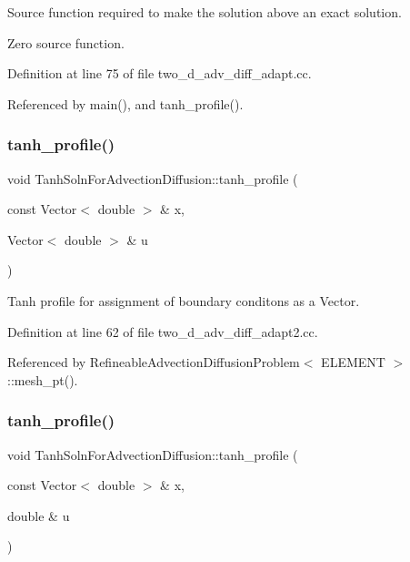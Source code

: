 Source function required to make the solution above an exact solution. 

Zero source function. 

Definition at line 75 of file two\+\_\+d\+\_\+adv\+\_\+diff\+\_\+adapt.\+cc.



Referenced by main(), and tanh\+\_\+profile().

\mbox{\label{namespaceTanhSolnForAdvectionDiffusion_a4016f2f5bd0c82061bee09043dc8e8e6}} 
\subsubsection{\texorpdfstring{tanh\+\_\+profile()}{tanh\_profile()}\hspace{0.1cm}{\footnotesize\ttfamily [1/2]}}
{\footnotesize\ttfamily void Tanh\+Soln\+For\+Advection\+Diffusion\+::tanh\+\_\+profile (\begin{DoxyParamCaption}\item[{const Vector$<$ double $>$ \&}]{x,  }\item[{Vector$<$ double $>$ \&}]{u }\end{DoxyParamCaption})}



Tanh profile for assignment of boundary conditons as a Vector. 



Definition at line 62 of file two\+\_\+d\+\_\+adv\+\_\+diff\+\_\+adapt2.\+cc.



Referenced by Refineable\+Advection\+Diffusion\+Problem$<$ E\+L\+E\+M\+E\+N\+T $>$\+::mesh\+\_\+pt().

\mbox{\label{namespaceTanhSolnForAdvectionDiffusion_afee88c1e0f93cc56d06c2e94aaf8449c}} 
\subsubsection{\texorpdfstring{tanh\+\_\+profile()}{tanh\_profile()}\hspace{0.1cm}{\footnotesize\ttfamily [2/2]}}
{\footnotesize\ttfamily void Tanh\+Soln\+For\+Advection\+Diffusion\+::tanh\+\_\+profile (\begin{DoxyParamCaption}\item[{const Vector$<$ double $>$ \&}]{x,  }\item[{double \&}]{u }\end{DoxyParamCaption})}



